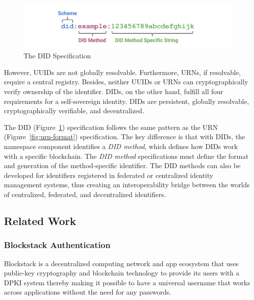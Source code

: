 		\begin{figure}[h]
			\includegraphics[width=\linewidth]{figures/did-format}
			\caption{\label{fig:did-format} The DID Specification\protect\cite{image:urn:did:1}}
		\end{figure}
	
		However, UUIDs are not globally resolvable. Furthermore, URNs, if resolvable, require a central registry. Besides, neither UUIDs or URNs can cryptographically verify ownership of the identifier. DIDs, on the other hand, fulfill all four requirements for a self-sovereign identity\cite{smith2016identity}. DIDs are persistent, globally resolvable, cryptographically verifiable, and decentralized.
		
		The DID (Figure~\ref{fig:did-format}) specification follows the same pattern as the URN (Figure~\ref{fig:urn-format}) specification. The key difference is that with DIDs, the namespace component identifies a \textit{DID method}, which defines how DIDs work with a specific blockchain. The \textit{DID method} specifications must define the format and generation of the method-specific identifier. The DID methods can also be developed for identifiers registered in federated or centralized identity management systems, thus creating an interoperability bridge between the worlds of centralized, federated, and decentralized identifiers.
	
	\subsection{Related Work}
		\subsubsection{Blockstack Authentication}\label{sec:blockstack-auth}
		Blockstack\cite{blockstack2019whitepaper} is a decentralized computing network and app ecosystem that uses public-key cryptography and blockchain technology to provide its users with a DPKI system thereby making it possible to have a universal username that works across applications without the need for any passwords.
		
